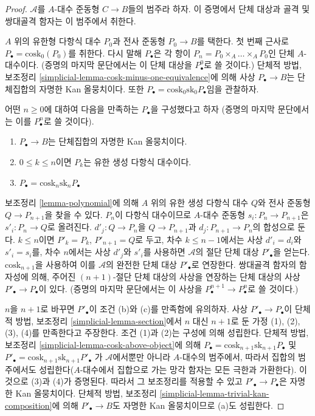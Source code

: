 \begin{proof}
$\mathcal{A}$를 $A$-대수 준동형 $C\to B$들의 범주라 하자. 이 증명에서
단체 대상과 골격 및 쌍대골격 함자는 이 범주에서 취한다.

\medskip\noindent
$A$ 위의 유한형 다항식 대수 $P_0$과 전사 준동형 $P_0\to B$를 택한다.
첫 번째 근사로 $P_\bullet=\text{cosk}_0(P_0)$를 취한다. 다시 말해
$P_\bullet$은 각 항이 $P_n=P_0\times_A\ldots\times_AP_0$인 단체
$A$-대수이다. (증명의 마지막 문단에서는 이 단체 대상을
$P^0_\bullet$로 쓸 것이다.) 단체적 방법, 보조정리
\ref{simplicial-lemma-cosk-minus-one-equivalence}에 의해 사상
$P_\bullet\to B$는 단체집합의 자명한 Kan 올뭉치이다. 또한
$P_\bullet=\text{cosk}_0\text{sk}_0P_\bullet$임을 관찰하자.

\medskip\noindent
어떤 $n\geq0$에 대하여 다음을 만족하는 $P_\bullet$을 구성했다고 하자
(증명의 마지막 문단에서는 이를 $P^n_\bullet$로 쓸 것이다).
\begin{enumerate}
\item[(a)] $P_\bullet\to B$는 단체집합의 자명한 Kan 올뭉치이다.
\item[(b)] $0\leq k\leq n$이면 $P_k$는 유한 생성 다항식 대수이다.
\item[(c)] $P_\bullet = \text{cosk}_n \text{sk}_n P_\bullet$
\end{enumerate}
보조정리 \ref{lemma-polynomial}에 의해 $A$ 위의 유한 생성 다항식 대수
$Q$와 전사 준동형 $Q\to P_{n+1}$을 찾을 수 있다. $P_n$이 다항식
대수이므로 $A$-대수 준동형 $s_i:P_n\to P_{n+1}$은
$s'_i:P_n\to Q$로 올려진다. $d'_j:Q\to P_n$을
$Q\to P_{n+1}$과 $d_j:P_{n+1}\to P_n$의 합성으로 둔다.
$k\leq n$이면 $P'_k=P_k$, $P'_{n+1}=Q$로 두고, 차수
$k\leq n-1$에서는 사상 $d'_i=d_i$와 $s'_i=s_i$를, 차수 $n$에서는
사상 $d'_j$와 $s'_i$를 사용하면 $\mathcal{A}$의 절단 단체 대상
$P'_\bullet$을 얻는다. $\text{cosk}_{n+1}$을 사용하여 이를
$\mathcal{A}$의 완전한 단체 대상 $P'_\bullet$로 연장한다. 쌍대골격
함자의 함자성에 의해, 주어진 $(n+1)$-절단 단체 대상의 사상을 연장하는
단체 대상의 사상 $P'_\bullet\to P_\bullet$이 있다. (증명의 마지막
문단에서는 이 사상을 $P^{n+1}_\bullet\to P^n_\bullet$로 쓸 것이다.)

\medskip\noindent
$n$을 $n+1$로 바꾸면 $P'_\bullet$이 조건 (b)와 (c)를 만족함에
유의하자. 사상 $P'_\bullet\to P_\bullet$이 단체적 방법, 보조정리
\ref{simplicial-lemma-section}에서 $n$ 대신 $n+1$로 둔 가정
(1), (2), (3), (4)를 만족한다고 주장한다. 조건 (1)과 (2)는 구성에 의해
성립한다. 단체적 방법, 보조정리
\ref{simplicial-lemma-cosk-above-object}에 의해
$P_\bullet = \text{cosk}_{n + 1}\text{sk}_{n + 1}P_\bullet$
및
$P'_\bullet = \text{cosk}_{n + 1}\text{sk}_{n + 1}P'_\bullet$
가 $\mathcal{A}$에서뿐만 아니라 $A$-대수의 범주에서, 따라서 집합의
범주에서도 성립한다($A$-대수에서 집합으로 가는 망각 함자는 모든 극한과
가환한다). 이것으로 (3)과 (4)가 증명된다. 따라서 그 보조정리를 적용할 수
있고 $P'_\bullet\to P_\bullet$은 자명한 Kan 올뭉치이다. 단체적 방법,
보조정리 \ref{simplicial-lemma-trivial-kan-composition}에 의해
$P'_\bullet\to B$도 자명한 Kan 올뭉치이므로 (a)도 성립한다.


\end{proof}
